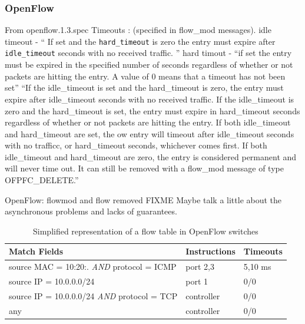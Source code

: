 \begin{itemize}
\begin{itemize}
\end{itemize}
\subsubsection{OpenFlow}

From openflow.1.3.spec \cite{openflow-spec}
Timeouts : (specified in flow_mod messages). 
idle timeout - `` If set and the \texttt{hard\_timeout} is zero the entry must expire after \texttt{idle\_timeout} seconds with no received traffic. ''
hard timout  - ``if set the entry must be expired in the specified number of seconds regardless of whether or not packets are hitting the entry. A value of 0 means that a timeout has not been set''
``If the idle_timeout is set and the hard_timeout is zero, the entry must expire after idle_timeout
seconds with no received traffic. If the idle\_timeout is zero and the hard_timeout is set, the entry
must expire in hard_timeout seconds regardless of whether or not packets are hitting the entry. If both
idle_timeout and hard\_timeout are set, the 
ow entry will timeout after idle_timeout seconds with
no trafficc, or hard_timeout seconds, whichever comes first. If both idle\_timeout and hard\_timeout are
zero, the entry is considered permanent and will never time out. It can still be removed with a flow_mod
message of type OFPFC\_DELETE.''

OpenFlow: flowmod and flow removed FIXME 
Maybe talk a little about the asynchronous problems and lacks of guarantees. 
\begin{table}[ht]
  \centering
  \begin{tabular}[ht]{lll}
    Match Fields &  Instructions & Timeouts \\ \toprule 
    source MAC = 10:20:. \emph{AND}  protocol = ICMP  & port 2,3 & 5,10 ms \\ 
    source IP = 10.0.0.0/24  & port 1 &  0/0 \\
    source IP = 10.0.0.0/24 \emph{AND} protocol = TCP & controller & 0/0 \\ 
    any & controller & 0/0 \\ \bottomrule 
  \end{tabular}
  \caption{Simplified representation of a flow table in OpenFlow switches }
  
\end{table}



\end{itemize}
